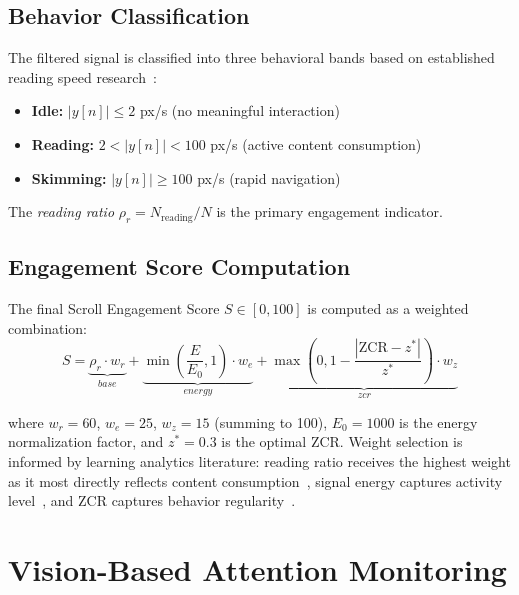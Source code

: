 \documentclass[conference]{IEEEtran}
\begin{document}
\subsection{Behavior Classification}

The filtered signal is classified into three behavioral bands based on established reading speed research~\cite{dyson2001}:
\begin{itemize}
    \item \textbf{Idle:} $|y[n]| \leq 2$ px/s (no meaningful interaction)
    \item \textbf{Reading:} $2 < |y[n]| < 100$ px/s (active content consumption)
    \item \textbf{Skimming:} $|y[n]| \geq 100$ px/s (rapid navigation)
\end{itemize}

The \textit{reading ratio} $\rho_r = N_{\text{reading}} / N$ is the primary engagement indicator.

\subsection{Engagement Score Computation}

The final Scroll Engagement Score $S \in [0, 100]$ is computed as a weighted combination:
\begin{equation}
S = \underbrace{\rho_r \cdot w_r}_{base} + \underbrace{\min\!\left(\frac{E}{E_0}, 1\right) \cdot w_e}_{energy} + \underbrace{\max\!\left(0, 1 - \frac{|\text{ZCR} - z^*|}{z^*}\right) \cdot w_z}_{zcr}
\label{eq:engagement}
\end{equation}

where $w_r = 60$, $w_e = 25$, $w_z = 15$ (summing to 100), $E_0 = 1000$ is the energy normalization factor, and $z^* = 0.3$ is the optimal ZCR. Weight selection is informed by learning analytics literature: reading ratio receives the highest weight as it most directly reflects content consumption~\cite{rayner1989}, signal energy captures activity level~\cite{baker2010}, and ZCR captures behavior regularity~\cite{woolf2009}.

\section{Vision-Based Attention Monitoring}
\label{sec:vision}
\end{document}
